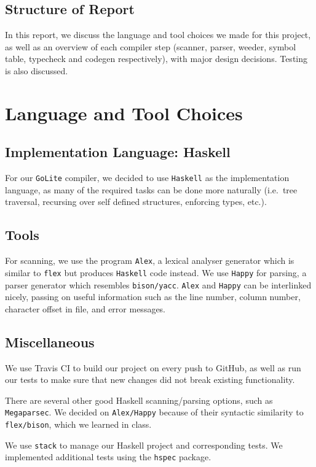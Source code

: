 \documentclass[11pt]{article}
\begin{document}
\subsection{Structure of Report}
In this report, we discuss the language and tool choices we made for
this project, as well as an overview of each compiler step (scanner,
parser, weeder, symbol table, typecheck and codegen respectively),
with major design decisions. Testing is also discussed.
\section{Language and Tool Choices}
\subsection{Implementation Language: Haskell}
For our \texttt{GoLite} compiler, we decided to use \texttt{Haskell}
as the implementation language, as many of the required tasks can be
done more naturally (i.e.\ tree traversal, recursing over self defined
structures, enforcing types, etc.).
\subsection{Tools}
For scanning, we use the program \texttt{Alex}\cite{github:alex}, a
lexical analyser generator which is similar to
\texttt{flex} but produces \texttt{Haskell} code instead. We use
\texttt{Happy}\cite{github:happy} for parsing, a parser generator which resembles
\texttt{bison/yacc}. \texttt{Alex} and \texttt{Happy} can be
interlinked nicely, passing on useful information such as the line number, column number, character
offset in file, and error messages.
\subsection{Miscellaneous}
We use Travis CI\cite{travisci} to build our project on every push to GitHub, as well
as run our tests to make sure that new changes did not break existing
functionality.

There are several other good Haskell scanning/parsing options, such as
\texttt{Megaparsec}. We decided on \texttt{Alex/Happy} because of
their syntactic similarity to \texttt{flex/bison}, which we learned in
class.

We use \texttt{stack}\cite{hs:stack} to manage our Haskell project and corresponding
tests.  We implemented additional tests using the \texttt{hspec}\cite{github:hspec}
package.
\end{document}
